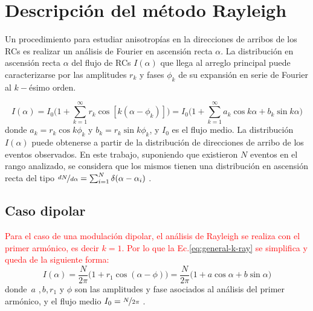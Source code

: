   \section{Descripción del método Rayleigh}
  Un procedimiento para estudiar anisotropías en la direcciones de arribos de los RCs es realizar un análisis de Fourier en ascensión recta $\alpha$. La distribución en ascensión recta $\alpha$ del flujo de RCs $I(\alpha)$ que llega al arreglo principal puede caracterizarse por las amplitudes $r_k$ y fases $\phi_k$ de su expansión en serie de Fourier al $k-$ésimo orden. 

  \begin{equation}
    I(\alpha) = I_0 \bigg ( 1+ \sum^\infty_{k=1} r_k\cos{[k(\alpha - \phi_k)]} \bigg) = I_0 \bigg ( 1+ \sum^\infty_{k=1} a_k\cos{k\alpha} +  b_k\sin{k\alpha} \bigg ) \label{eq:general-k-ray}
  \end{equation}
  donde $a_k=r_k\cos k\phi_k$ y $b_k=r_k\sin k \phi_k$, y $I_0$ es el flujo medio. La distribución $I(\alpha)$ puede obtenerse a partir de la distribución de direcciones de arribo de los eventos observados.  En este trabajo, suponiendo que existieron $N$ eventos en el rango analizado, se considera que los mismos tienen una distribución en ascensión recta del tipo $\nicefrac{dN}{d\alpha}= \sum^N_{i=1} \delta(\alpha - \alpha_i)$ \cite{taborda}. 

  \subsection{Caso dipolar} \label{caso_dipolar}
  \textcolor{red}{Para el caso de una modulación dipolar, el análisis de Rayleigh se realiza con el primer armónico, es decir $k=1$. Por lo que la Ec.\ref{eq:general-k-ray} se simplifica y queda de la siguiente forma:}
  \begin{equation}
    I(\alpha) = \frac{N}{2\pi} \bigg ( 1+ r_1\cos{(\alpha - \phi)} \bigg) = \frac{N}{2\pi}\bigg ( 1+ a\cos{\alpha} +  b\sin{\alpha} \bigg ) \label{eq:general-1-ray}
  \end{equation}
  donde $\, a$ ,$\, b$,$\, r_1$ y $\phi$ son las amplitudes y fase asociados al análisis del primer armónico, y el flujo medio $I_0=\nicefrac{N}{2\pi}$ \cite{taborda}.

  

